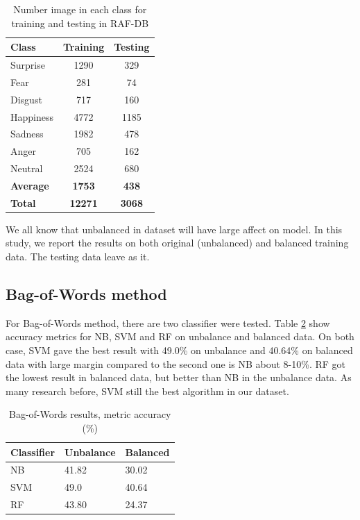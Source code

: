 \documentclass[12pt]{article}
\begin{document}
\begin{table}[h!]
\centering
\caption{Number image in each class for training and testing in RAF-DB} \label{tbl:raf-db-count}
\begin{tabular}{|l|c|c|}
\hline
\textbf{Class} & \textbf{Training} & \textbf{Testing} \\ \hline
Surprise & 1290 & 329 \\ \hline
Fear & 281 & 74 \\ \hline
Disgust & 717 & 160 \\ \hline
Happiness & 4772 & 1185 \\ \hline
Sadness & 1982 & 478 \\ \hline
Anger & 705 & 162 \\ \hline
Neutral & 2524 & 680 \\ \hline \hline
\textbf{Average} & \textbf{1753} & \textbf{438} \\ \hline
\textbf{Total} & \textbf{12271} & \textbf{3068} \\ \hline
\end{tabular}
\end{table}

We all know that unbalanced in dataset will have large affect on model.
In this study, we report the results on both original (unbalanced) and balanced training data.
The testing data leave as it.

\subsection{Bag-of-Words method}
For Bag-of-Words method, there are two classifier were tested.
Table \ref{tbl:bag-of-words-metric} show accuracy metrics for NB, SVM and RF on unbalance and balanced data.
On both case, SVM gave the best result with 49.0\% on unbalance and 40.64\% on balanced data with large margin compared to the second one is NB about 8-10\%.
RF got the lowest result in balanced data, but better than NB in the unbalance data.
As many research before, SVM still the best algorithm in our dataset.

\begin{table}[h!]
\centering
\caption{Bag-of-Words results, metric accuracy (\%)} \label{tbl:bag-of-words-metric}
\begin{tabular}{|l|l|l|}
\hline
Classifier & Unbalance & Balanced \\ \hline
NB & 41.82 & 30.02 \\ \hline
SVM & 49.0 & 40.64 \\ \hline
RF & 43.80 & 24.37 \\ \hline
\end{tabular}
\end{table}
\end{document}
